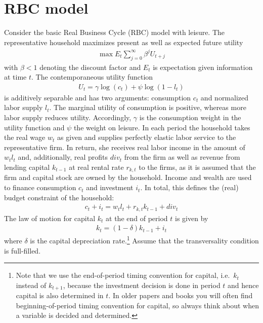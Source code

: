 \section[RBC model]{RBC model\label{ex:RBCModel}}
Consider the basic Real Business Cycle (RBC) model with leisure.
The representative household maximizes present as well as expected future utility
\begin{align*}
	\max E_t \sum_{j=0}^{\infty} \beta^{j} U_{t+j}
\end{align*}
with \(\beta <1\) denoting the discount factor and \(E_t\) is expectation given information at time \(t\).
The contemporaneous utility function 
\begin{align*}
	U_t = \gamma \log(c_t) + \psi \log{(1-l_{t})}
\end{align*}
is additively separable and has two arguments: consumption \(c_t\) and normalized labor supply \(l_{t}\).
The marginal utility of consumption is positive, whereas more labor supply reduces utility.
Accordingly, \(\gamma \) is the consumption weight in the utility function and \(\psi \) the weight on leisure.
In each period the household takes the real wage \(w_t\) as given and supplies perfectly elastic labor service to the representative firm.
In return, she receives real labor income in the amount of \(w_t l_{t}\) and, additionally,
  real profits \({div}_t\) from the firm as well as revenue from lending capital \(k_{t-1}\) at real rental rate \(r_{k,t}\) to the firms,
  as it is assumed that the firm and capital stock are owned by the household.
Income and wealth are used to finance consumption \(c_t\) and investment \(i_t\).
In total, this defines the (real) budget constraint of the household:
\begin{align*}
c_t + i_t = w_t l_{t} + r_{k,t} k_{t-1} + {div}_t
\end{align*}
The law of motion for capital \(k_t\) at the end of period \(t\) is given by
\begin{align*}
k_{t} = (1-\delta) k_{t-1} + i_t
\end{align*}
where \(\delta \) is the capital depreciation rate.\footnote{%
    Note that we use the end-of-period timing convention for capital, i.e.\
    \(k_t\) instead of \(k_{t+1}\),
    because the investment decision is done in period \(t\) and hence capital is also determined in \(t\).
    In older papers and books you will often find beginning-of-period timing convention for capital,
    so always think about when a variable is decided and determined.}
Assume that the transversality condition is full-filled.
	
